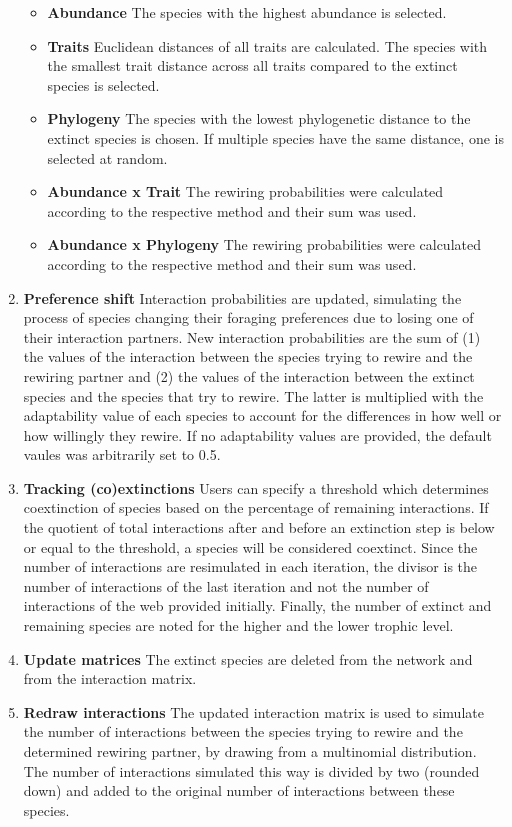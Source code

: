 \documentclass[12pt,a4paper]{article}
\begin{document}
\begin{enumerate}
		\begin{itemize}
		\item \label{itm:abund_rew} \textbf{Abundance} {\small The species with the highest abundance is selected.}
		\item \label{itm:trait_rew} \textbf{Traits} {\small Euclidean distances of all traits are calculated. The species with the smallest trait distance across all traits compared to the extinct species is selected.}
		\item \label{itm:phylo_rew} \textbf{Phylogeny} {\small The species with the lowest phylogenetic distance to the extinct species is chosen. If multiple species have the same distance, one is selected at random.}
		\item \label{itm:AT_rew} \textbf{Abundance x Trait} {\small The rewiring probabilities were calculated according to the respective method and their sum was used.}
		\item \label{itm:AP_rew} \textbf{Abundance x Phylogeny} {\small The rewiring probabilities were calculated according to the respective method and their sum was used.}
		\end{itemize}
	\item \label{itm:shift} \textbf{Preference shift} {\small Interaction probabilities are updated, simulating the process of species changing their foraging preferences due to losing one of their interaction partners. New interaction probabilities are the sum of (1) the values of the interaction between the species trying to rewire and the rewiring partner and (2) the values of the interaction between the extinct species and the species that try to rewire. The latter is multiplied with the adaptability value of each species to account for the differences in how well or how willingly they rewire. If no adaptability values are provided, the default vaules was arbitrarily set to 0.5.}
	\item  \label{itm:track} \textbf{Tracking (co)extinctions} {\small Users can specify a threshold which determines coextinction of species based on the percentage of remaining interactions. If the quotient of total interactions after and before an extinction step is below or equal to the threshold, a species will be considered coextinct. Since the number of interactions are resimulated in each iteration, the divisor is the number of interactions of the last iteration and not the number of interactions of the web provided initially. Finally, the number of extinct and remaining species are noted for the higher and the lower trophic level.}
	\item \label{itm:update} \textbf{Update matrices} {\small The extinct species are deleted from the network and from the interaction matrix.}
	\item \label{itm:redraw} \textbf{Redraw interactions} {\small The updated interaction matrix is used to simulate the number of interactions between the species trying to rewire and the determined rewiring partner, by drawing from a multinomial distribution. The number of interactions simulated this way is divided by two (rounded down) and added to the original number of interactions between these species.}
	\end{enumerate}
\end{document}
